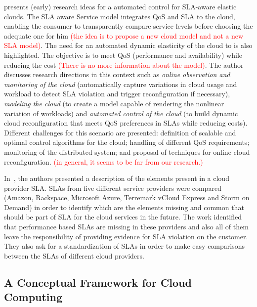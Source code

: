 \documentclass[12pt,a4paper,oneside]{article}
\begin{document}
\cite{013} presents (early) research ideas for a automated control for SLA-aware elastic clouds. The SLA aware Service model integrates QoS and SLA to the cloud, enabling the consumer to transparently compare service levels before choosing the adequate one for him \textcolor{red}{(the idea is to propose a new cloud model and not a new SLA model)}. The need for an automated dynamic elasticity of the cloud to is also highlighted. The objective is to meet QoS (performance and availability) while reducing the cost \textcolor{red}{(There is no more information about the model)}. The author discusses research directions in this context such as \textit{online observation and monitoring of the cloud} (automatically capture variations in cloud usage and workload to detect SLA violation and trigger reconfiguration if necessary), \textit{modeling the cloud} (to create a model capable of rendering the nonlinear variation of workloads) and \textit{automated control of the cloud} (to build dynamic cloud reconfiguration that meets QoS preferences in SLAs while reducing costs). Different challenges for this scenario are presented: definition of scalable and optimal control algorithms for the cloud; handling of different QoS requirements; monitoring of the distributed system; and proposal of techniques for online cloud reconfiguration. \textcolor{red}{(in general, it seems to be far from our research.)}

\bigskip
In~\cite{010}, the authors presented a description of the elements present in a cloud provider SLA. SLAs from five different service providers were compared (Amazon, Rackspace, Microsoft Azure, Terremark vCloud Express and Storm on Demand) in order to identify which are the elements missing and common that should be part of SLA for the cloud services in the future. The work identified that performance based SLAs are missing in these providers and also all of them leave the responsibility of providing evidence for SLA violation on the customer. They also ask for a standardization of SLAs in order to make easy comparisons between the SLAs of different cloud providers.

\subsection{A Conceptual Framework for Cloud Computing}
\end{document}
